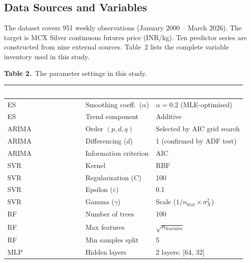 \documentclass[12pt,a4paper]{article}
\newcommand{\hdrrow}[1]{\textcolor{white}{\textbf{#1}}}
\begin{document}
\subsection{Data Sources and Variables}

The dataset covers 951 weekly observations (January 2000 -- March 2026). The target
is MCX Silver continuous futures price (INR/kg). Ten predictor series are constructed
from nine external sources. Table~2 lists the complete variable inventory used in this
study.

\vspace{4pt}
\noindent\textbf{Table 2.}~The parameter settings in this study.
\vspace{3pt}

\renewcommand{\arraystretch}{1.2}

\noindent\small
\begin{tabular}{L{3.5cm} L{4.2cm} L{5.0cm}}
\hdrrow{Model / Component} & \hdrrow{Parameter} & \hdrrow{Value / Setting} \\
\hline
ES                       & Smoothing coeff.\ ($\alpha$)         & $\alpha=0.2$ (MLE-optimised) \\
ES                       & Trend component                      & Additive \\
ARIMA                    & Order $(p,d,q)$                      & Selected by AIC grid search \\
ARIMA                    & Differencing ($d$)                   & 1 (confirmed by ADF test) \\
ARIMA                    & Information criterion                & AIC \\
SVR                      & Kernel                               & RBF \\
SVR                      & Regularisation ($C$)                 & 100 \\
SVR                      & Epsilon ($\varepsilon$)              & 0.1 \\
SVR                      & Gamma ($\gamma$)                     & Scale ($1/n_\text{feat} \times \sigma^2_X$) \\
RF                       & Number of trees                      & 100 \\
RF                       & Max features                         & $\sqrt{n_\text{features}}$ \\
RF                       & Min samples split                    & 5 \\
MLP                      & Hidden layers                        & 2 layers: [64, 32] \\

\end{tabular}
\end{document}
